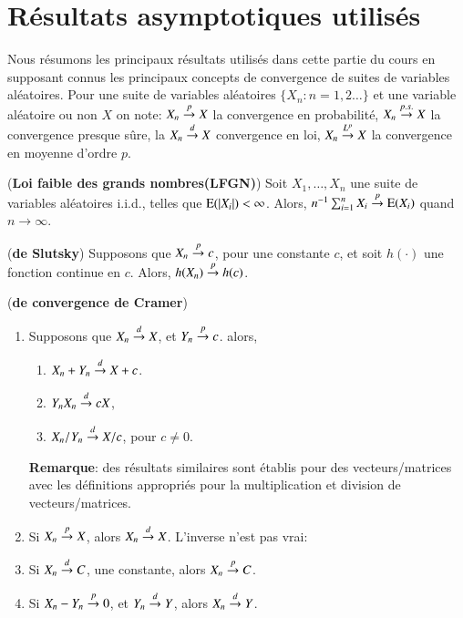 \documentclass[10pt, reqno]{amsart}
\begin{document}
\newpage


\appendix

\section{Résultats asymptotiques utilisés}

Nous résumons les principaux résultats utilisés dans cette partie du cours en supposant connus les principaux concepts de 
convergence de suites de variables aléatoires. Pour une suite de variables aléatoires 
$\{X_n: n = 1, 2\ldots\}$ et une variable aléatoire ou non $X$ on note: $X_n\overset{p}{\rightarrow} X$ 
la convergence en probabilité, $X_n\overset{p.s.}{\rightarrow} X$ la convergence presque sûre, la $X_n\overset{d}{\rightarrow} X$
convergence en loi, $X_n\overset{L^p}{\rightarrow} X$ la convergence en moyenne d'ordre $p$.

\begin{theoreme}(\textbf{Loi faible des grands nombres(LFGN)})
    Soit $X_1, \ldots, X_n$ une suite de variables aléatoires i.i.d., telles que $\operatorname{E}(\left\vert {X_i} \right\vert) <\infty$. Alors, 
    $n^{-1}\sum_{i=1}^n X_i\overset{p}{\rightarrow} \operatorname{E}(X_i)$ quand $n\to\infty$.
\end{theoreme}

\begin{theoreme}(\textbf{de Slutsky})
Supposons que $X_n \overset{p}{\rightarrow} c$, pour une constante $c$, et soit $h(\cdot)$ une fonction continue en $c$. Alors, 
$h(X_n)\overset{p}{\rightarrow} h(c)$.
\end{theoreme}

\begin{theoreme}(\textbf{de convergence de Cramer})
    \begin{enumerate}[label = (\roman*)]
    \item Supposons que $X_n \overset{d}{\rightarrow} X$, et $Y_n \overset{p}{\rightarrow} c$. alors,
    \begin{enumerate}[label = (\alph*)]
        \item $X_n + Y_n \overset{d}{\rightarrow} X + c$.
        \item $Y_nX_n \overset{d}{\rightarrow} cX$,
        \item $X_n/Y_n \overset{d}{\rightarrow} X/c$, pour $c\neq 0$.
    \end{enumerate}
    \textbf{Remarque}: des résultats similaires sont établis pour des vecteurs/matrices avec 
les définitions appropriés pour la multiplication et division de vecteurs/matrices.
    \item  Si $X_n \overset{p}{\rightarrow} X$, alors $X_n \overset{d}{\rightarrow} X$. L'inverse n'est pas vrai:
    \item Si $X_n \overset{d}{\rightarrow} C$, une constante, alors $X_n \overset{p}{\rightarrow} C$.
    \item  Si $X_n - Y_n \overset{p}{\rightarrow} 0$, et $Y_n \overset{d}{\rightarrow} Y$, alors $X_n\overset{d}{\rightarrow} Y$.
    \end{enumerate}
\end{theoreme}
\newpage
\end{document}
